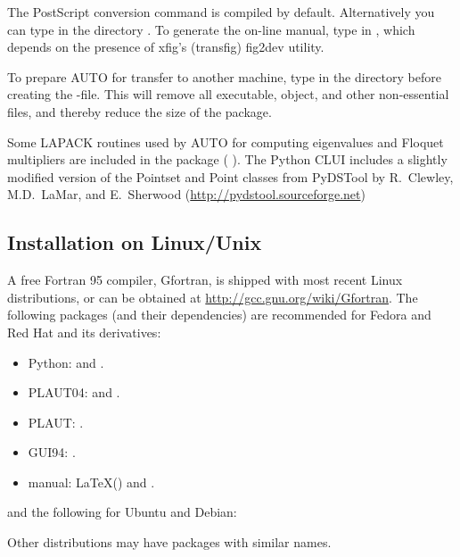 \documentclass[12pt]{report}
\begin{document}
The PostScript conversion command  is compiled by
default. Alternatively you can type  in the directory
.
To generate the on-line manual, type  in
, which depends on the presence of xfig's
(transfig) fig2dev utility.

To prepare {\cal AUTO} for transfer to another machine,
type 
in the directory  before creating the -file. 
This will remove all executable, object, and other non-essential files, and
thereby reduce the size of the package.

Some {\cal LAPACK} routines used by {\cal AUTO} for computing eigenvalues and
Floquet multipliers are included in the package
( \citeyear{LAPACK:99}).
The Python CLUI includes a slightly modified version of the Pointset
and Point classes from PyDSTool by R.~Clewley, M.D.~LaMar, and E.~Sherwood
(\url{http://pydstool.sourceforge.net})

\subsection{Installation on Linux/Unix}
A free Fortran 95 compiler, Gfortran, is shipped with most recent
Linux distributions, or can be obtained at 
\url{http://gcc.gnu.org/wiki/Gfortran}.
The following packages (and their dependencies) are recommended for
Fedora and Red Hat and its derivatives:
\begin{itemize}
\item Python:  and .
\item {\cal PLAUT04}:  and .
\item {\cal PLAUT}: .
\item GUI94: .
\item manual: \LaTeX () and .
\end{itemize}
and the following for Ubuntu and Debian:
\begin{itemize}
\item Python:  and .
\item {\cal PLAUT04}: SoQt ().
\item {\cal PLAUT}: .
\item GUI94: .
\item manual: \LaTeX (, }, and \filef{transfig}.
\end{itemize}
Other distributions may have packages with similar names.
\end{document}
